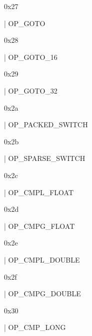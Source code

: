 \documentclass[11pt]{article}
\begin{document}
\begin{ocamldoccomment}
0x27
\end{ocamldoccomment}
\begin{ocamldoccode}
  | OP_GOTO
\end{ocamldoccode}
\begin{ocamldoccomment}
0x28
\end{ocamldoccomment}
\begin{ocamldoccode}
  | OP_GOTO_16
\end{ocamldoccode}
\begin{ocamldoccomment}
0x29
\end{ocamldoccomment}
\begin{ocamldoccode}
  | OP_GOTO_32
\end{ocamldoccode}
\begin{ocamldoccomment}
0x2a
\end{ocamldoccomment}
\begin{ocamldoccode}
  | OP_PACKED_SWITCH
\end{ocamldoccode}
\begin{ocamldoccomment}
0x2b
\end{ocamldoccomment}
\begin{ocamldoccode}
  | OP_SPARSE_SWITCH
\end{ocamldoccode}
\begin{ocamldoccomment}
0x2c
\end{ocamldoccomment}
\begin{ocamldoccode}
  | OP_CMPL_FLOAT
\end{ocamldoccode}
\begin{ocamldoccomment}
0x2d
\end{ocamldoccomment}
\begin{ocamldoccode}
  | OP_CMPG_FLOAT
\end{ocamldoccode}
\begin{ocamldoccomment}
0x2e
\end{ocamldoccomment}
\begin{ocamldoccode}
  | OP_CMPL_DOUBLE
\end{ocamldoccode}
\begin{ocamldoccomment}
0x2f
\end{ocamldoccomment}
\begin{ocamldoccode}
  | OP_CMPG_DOUBLE
\end{ocamldoccode}
\begin{ocamldoccomment}
0x30
\end{ocamldoccomment}
\begin{ocamldoccode}
  | OP_CMP_LONG
\end{ocamldoccode}
\end{document}
